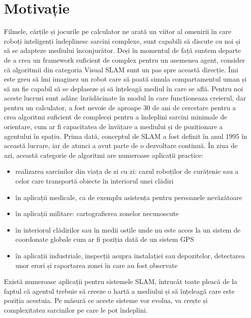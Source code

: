 \documentclass[12pt,a4paper]{report}
\begin{document}
\section{Motivație}
Filmele, cărțile și jocurile pe calculator ne arată un viitor al omenirii în care
roboți inteligenți îndeplinesc sarcini complexe, sunt capabili să discute cu noi și 
să se adapteze mediului înconjurător. Deși în momentul de față suntem departe de a
crea un framework suficient de complex pentru un asemenea agent, consider că algoritmii din categoria 
Visual SLAM sunt un pas spre această direcție. Îmi este greu să îmi imaginez un robot care
să poată simula compartamentul uman și să nu fie capabil să se deplaseze și să înțeleagă mediul
în care se află. Pentru noi aceste lucruri sunt adânc înrădăcinate în modul în care funcționeaza creierul, dar pentru
un calculator, a fost nevoie de aproape 30 de ani de cercetare pentru a crea algoritmi 
suficient de complecși pentru a îndeplini sarcini minimale de orientare, cum ar fi 
capacitatea de învățare a mediului și de poziționare a agentului în spațiu. Prima
dată, conceptul de SLAM a fost definit în anul 1995 în această lucrare\cite{durrant1996slam}, 
iar de atunci a avut parte de o dezvoltare continuă. În ziua de azi, această categorie 
de algoritmi are numeroase aplicații practice: 
\begin{itemize}
    \item realizarea sarcinilor din viața de zi cu zi: cazul roboților de curățenie
sau a celor care transportă obiecte în interiorul unei clădiri 
    \item în aplicații medicale, ca de exemplu asistența pentru persoanele nevăzătoare
    \item în aplicații militare: cartografierea zonelor necunoscute
    \item în interiorul clădirilor sau în medii ostile unde nu este acces la un sistem de coordonate globale
cum ar fi poziția dată de un sistem GPS  
    \item în aplicații industriale, inspecții asupra instalației sau depozitelor, 
detectarea unor erori și raportarea zonei în care au fost observate    
\end{itemize}
Există numeroase aplicații pentru sistemele SLAM, întrucât toate pleacă de la faptul 
că agentul trebuie să creeze o hartă a mediului și să înțeleagă care este poziția acestuia.
Pe măsură ce aceste sisteme vor evolua, va crește și complexitatea sarcinilor pe 
care le pot îndeplini.   
\end{document}
